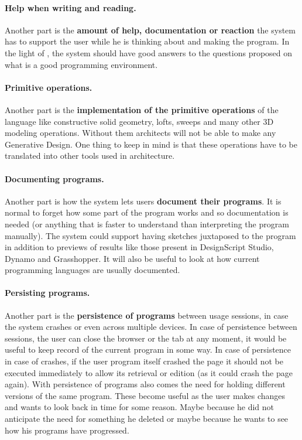 \documentclass{./llncs2e/llncs}
\begin{document}
	\paragraph{Help when writing and reading.}
	Another part is the \textbf{amount of help, documentation or reaction} the system has to support the user while he is thinking about and making the program.
	In the light of \cite{victor2012learnable}, the system should have good answers to the questions proposed on what is a good programming environment.

	\paragraph{Primitive operations.}
	Another part is the \textbf{implementation of the primitive operations} of the language like constructive solid geometry, lofts, sweeps and many other 3D modeling operations.
	Without them architects will not be able to make any Generative Design.
	One thing to keep in mind is that these operations have to be translated into other tools used in architecture.

	\paragraph{Documenting programs.}
	Another part is how the system lets users \textbf{document their programs}. 
	It is normal to forget how some part of the program works and so documentation is needed (or anything that is faster to understand than interpreting the program manually).
	The system could support having sketches juxtaposed to the program in addition to previews of results like those present in DesignScript Studio, Dynamo and Grasshopper. 
	It will also be useful to look at how current programming languages are usually documented. 

	\paragraph{Persisting programs.}
	Another part is the \textbf{persistence of programs} between usage sessions, in case the system crashes or even across multiple devices.
	In case of persistence between sessions, the user can close the browser or the tab at any moment, it would be useful to keep record of the current program in some way. 
	In case of persistence in case of crashes, if the user program itself crashed the page it should not be executed immediately to allow its retrieval or edition (as it could crash the page again). 
	With persistence of programs also comes the need for holding different versions of the same program. 
	These become useful as the user makes changes and wants to look back in time for some reason. 
	Maybe because he did not anticipate the need for something he deleted or maybe because he wants to see how his programs have progressed.
\end{document}
